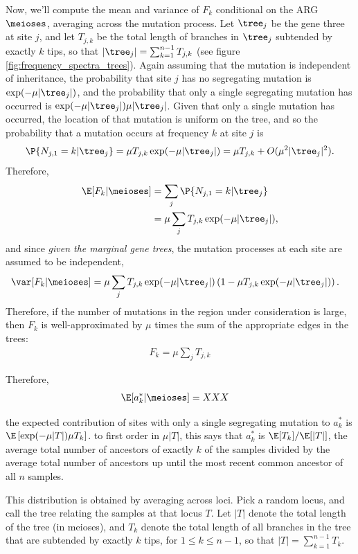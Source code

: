 Now, we'll compute the mean and variance of $F_k$
conditional on the ARG $\meioses$, averaging across the mutation process.
Let $\tree_j$ be the gene three at site $j$,
and let $T_{j,k}$ be the total length of branches in $\tree_j$ subtended by exactly $k$ tips,
so that $|\tree_j| = \sum_{k=1}^{n-1} T_{j,k}$
(see figure \ref{fig:frequency_spectra_trees}).
Again assuming that the mutation is independent of inheritance,
the probability that site $j$ has no segregating mutation is $\exp(-\mu |\tree_j|)$,
and the probability that only a single segregating mutation has occurred is $\exp(-\mu |\tree_j|) \mu |\tree_j|$.
Given that only a single mutation has occurred,
the location of that mutation is uniform on the tree,
and so the probability that a mutation occurs at frequency $k$ at site $j$ is
\[
\P\{ N_{j,1}=k \vert \tree_j \}
  = \mu T_{j,k}  \exp(-\mu |\tree_j|)  = \mu T_{j,k} + O(\mu^2 |\tree_j|^2).
\]
Therefore, 
\begin{align}
  \E[ F_k \vert \meioses ] &= \sum_j \P\{ N_{j,1}=k \vert \tree_j \} \\
        &= \mu \sum_j T_{j,k}  \exp(-\mu |\tree_j|) ,
\end{align}
and since \emph{given the marginal gene trees}, the mutation processes at each site are assumed to be independent,
\begin{align}
  \var[ F_k \vert \meioses ] &= \mu \sum_j T_{j,k}  \exp(-\mu |\tree_j|) \left( 1 - \mu T_{j,k}  \exp(-\mu |\tree_j|) \right).
\end{align}
Therefore, if the number of mutations in the region under consideration is large,
then $F_k$ is well-approximated by $\mu$ times the sum of the appropriate edges in the trees:
\begin{align}
  F_k = \mu \sum_j T_{j,k}
\end{align}


Therefore, 
\begin{align}
  \E[ a^*_k \vert \meioses ] &= XXX
\end{align}

the expected contribution of sites with only a single segregating mutation
to $a_k^*$ is $\E\left[ \exp(-\mu |T|) \mu T_k \right]$.
to first order in $\mu |T|$, this says that $a_k^*$ is $\E[T_k]/\E[|T|]$,
the average total number of ancestors of exactly $k$ of the samples
divided by the average total number of ancestors up until the most recent common ancestor of all $n$ samples.


This distribution is obtained by averaging across loci.
Pick a random locus, and call the tree relating the samples at that locus $T$.
Let $|T|$ denote the total length of the tree (in meioses),
and $T_k$ denote the total length of all branches in the tree that are subtended by exactly $k$ tips,
for $1 \le k \le n-1$, so that $|T| = \sum_{k=1}^{n-1} T_k$.




